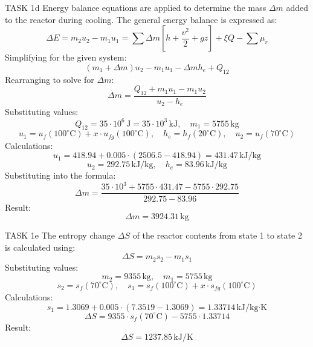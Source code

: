 TASK 1d  
Energy balance equations are applied to determine the mass \( \Delta m \) added to the reactor during cooling. The general energy balance is expressed as:  
\[
\Delta E = m_2 u_2 - m_1 u_1 = \sum \Delta m \left[ h + \frac{v^2}{2} + gz \right] + \xi Q - \sum \mu_r
\]  
Simplifying for the given system:  
\[
(m_1 + \Delta m) u_2 - m_1 u_1 - \Delta m h_e + Q_{12}
\]  
Rearranging to solve for \( \Delta m \):  
\[
\Delta m = \frac{Q_{12} + m_1 u_1 - m_1 u_2}{u_2 - h_e}
\]  
Substituting values:  
\[
Q_{12} = 35 \cdot 10^6 \, \text{J} = 35 \cdot 10^3 \, \text{kJ}, \quad m_1 = 5755 \, \text{kg}
\]  
\[
u_1 = u_f(100^\circ\text{C}) + x \cdot u_{fg}(100^\circ\text{C}), \quad h_e = h_f(20^\circ\text{C}), \quad u_2 = u_f(70^\circ\text{C})
\]  
Calculations:  
\[
u_1 = 418.94 + 0.005 \cdot (2506.5 - 418.94) = 431.47 \, \text{kJ/kg}
\]  
\[
u_2 = 292.75 \, \text{kJ/kg}, \quad h_e = 83.96 \, \text{kJ/kg}
\]  
Substituting into the formula:  
\[
\Delta m = \frac{35 \cdot 10^3 + 5755 \cdot 431.47 - 5755 \cdot 292.75}{292.75 - 83.96}
\]  
Result:  
\[
\Delta m = 3924.31 \, \text{kg}
\]  

TASK 1e  
The entropy change \( \Delta S \) of the reactor contents from state 1 to state 2 is calculated using:  
\[
\Delta S = m_2 s_2 - m_1 s_1
\]  
Substituting values:  
\[
m_2 = 9355 \, \text{kg}, \quad m_1 = 5755 \, \text{kg}
\]  
\[
s_2 = s_f(70^\circ\text{C}), \quad s_1 = s_f(100^\circ\text{C}) + x \cdot s_{fg}(100^\circ\text{C})
\]  
Calculations:  
\[
s_1 = 1.3069 + 0.005 \cdot (7.3519 - 1.3069) = 1.33714 \, \text{kJ/kg·K}
\]  
\[
\Delta S = 9355 \cdot s_f(70^\circ\text{C}) - 5755 \cdot 1.33714
\]  
Result:  
\[
\Delta S = 1237.85 \, \text{kJ/K}
\]